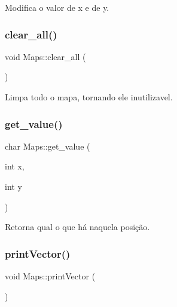 Modifica o valor de x e de y. 

\mbox{\label{classMaps_a0a7f0ddaeb883334dfa9a16bfc0b3356}} 
\subsubsection{\texorpdfstring{clear\+\_\+all()}{clear\_all()}}
{\footnotesize\ttfamily void Maps\+::clear\+\_\+all (\begin{DoxyParamCaption}{ }\end{DoxyParamCaption})\hspace{0.3cm}{\ttfamily [inline]}}



Limpa todo o mapa, tornando ele inutilizavel. 

\mbox{\label{classMaps_a7217b2b2818eb73c1cf5505f3837d665}} 
\subsubsection{\texorpdfstring{get\+\_\+value()}{get\_value()}}
{\footnotesize\ttfamily char Maps\+::get\+\_\+value (\begin{DoxyParamCaption}\item[{int}]{x,  }\item[{int}]{y }\end{DoxyParamCaption})\hspace{0.3cm}{\ttfamily [inline]}}



Retorna qual o que há naquela posição. 

\mbox{\label{classMaps_a068e03c298dd238deb000702dec960e8}} 
\subsubsection{\texorpdfstring{print\+Vector()}{printVector()}}
{\footnotesize\ttfamily void Maps\+::print\+Vector (\begin{DoxyParamCaption}{ }\end{DoxyParamCaption})\hspace{0.3cm}{\ttfamily [inline]}}



